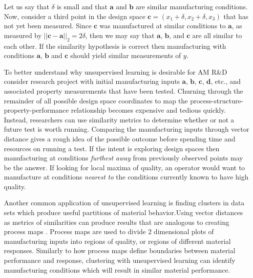 Let us say that $\delta$ is small and that $\mathbf{a}$ and $\mathbf{b}$ are similar manufacturing conditions.
Now, consider a third point in the design space $\mathbf{c} = (x_{1} + \delta, x_2 + \delta, x_3)$ that has not yet been measured.
Since $\mathbf{c}$ was manufactured at similar conditions to $\mathbf{a}$, as measured by $||\mathbf{c} - \mathbf{a}||_2 = 2\delta$, then we may say that $\mathbf{a}$, $\mathbf{b}$, and $\mathbf{c}$ are all similar to each other. If the similarity hypothesis is correct then manufacturing with conditions $\mathbf{a}$, $\mathbf{b}$ and $\mathbf{c}$ should yield similar measurements of $y$.

To better understand why unsupervised learning is desirable for AM R\&D consider research project with initial manufacturing inputs $\mathbf{a}$, $\mathbf{b}$, $\mathbf{c}$, $\mathbf{d}$, etc., and associated property measurements that have been tested. Churning through the remainder of all possible design space coordinates to map the process-structure-property-performance relationship becomes expensive and tedious quickly. Instead, researchers can use similarity metrics to determine whether or not a future test is worth running. Comparing the manufacturing inputs through vector distance gives a rough idea of the possible outcome before spending time and resources on running a test. If the intent is exploring design spaces then manufacturing at conditions \textit{furthest away} from previously observed points may be the answer. If looking for local maxima of quality, an operator would want to manufacture at conditions \textit{nearest to} the conditions currently known to have high quality.

Another common application of unsupervised learning is finding clusters in data sets which produce useful partitions of material behavior.Using vector distances as metrics of similarities can produce results that are analogous to creating process maps \cite{Beuth2001}. Process maps are used to divide $2$ dimensional plots of manufacturing inputs into regions of quality, or regions of different material responses. Similarly to how process maps define boundaries between material performance and response, clustering with unsupervised learning can identify manufacturing conditions which will result in similar material performance.



